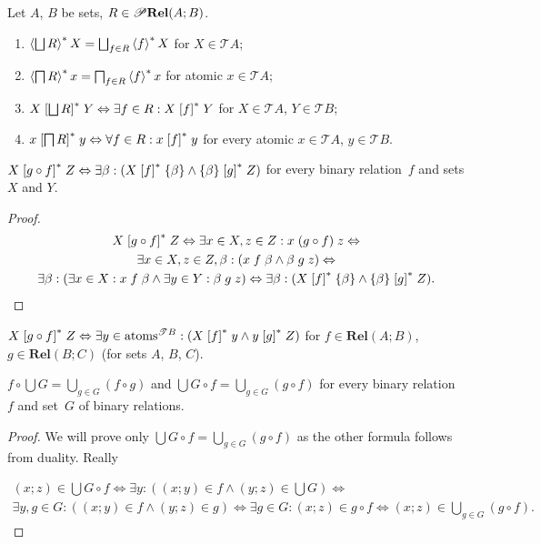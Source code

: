 \begin{cor}
Let $A$, $B$ be sets, $R\in\mathscr{P}\mathbf{Rel}(A;B)$.
\begin{enumerate}
\item \textbf{$\left\langle \bigsqcup R\right\rangle ^{\ast}X=\bigsqcup_{f\in R}\left\langle f\right\rangle ^{\ast}X$} for
$X\in\mathscr{T}A$;
\item $\left\langle \bigsqcap R\right\rangle ^{\ast}x=\bigsqcap_{f\in R}\left\langle f\right\rangle ^{\ast}x$ for atomic
$x\in\mathscr{T}A$;
\item $X\mathrel{\left[\bigsqcup R\right]^{\ast}}Y\Leftrightarrow\exists f\in R:X\mathrel{\left[f\right]^{\ast}}Y$
for $X\in\mathscr{T}A$, $Y\in\mathscr{T}B$;
\item $x\mathrel{\left[\bigsqcap R\right]^{\ast}}y\Leftrightarrow\forall f\in R:x\mathrel{\left[f\right]^{\ast}}y$
for every atomic $x\in\mathscr{T}A$, $y\in\mathscr{T}B$.
\end{enumerate}
\end{cor}
\begin{prop}
$X\mathrel{\left[g\circ f\right]^{\ast}}Z\Leftrightarrow\exists\beta:(X\mathrel{\left[f\right]^{\ast}}\{\beta\}\land\{\beta\}\mathrel{\left[g\right]^{\ast}}Z)$
for every binary relation~$f$ and sets $X$ and $Y$.\end{prop}
\begin{proof}
~
\begin{multline*}
X\mathrel{\left[g\circ f\right]^{\ast}}Z\Leftrightarrow\exists x\in X,z\in Z:x\mathrel{(g\circ f)}z\Leftrightarrow\\
\exists x\in X,z\in Z,\beta:(x\mathrel f\beta\land\beta\mathrel gz)\Leftrightarrow\\
\exists\beta:(\exists x\in X:x\mathrel f\beta\land\exists y\in Y:\beta\mathrel gz)\Leftrightarrow\exists\beta:(X\mathrel{\left[f\right]^{\ast}}\{\beta\}\land\{\beta\}\mathrel{\left[g\right]^{\ast}}Z).
\end{multline*}
\end{proof}
\begin{cor}
$X\mathrel{\left[g\circ f\right]^{\ast}}Z\Leftrightarrow\exists y\in\operatorname{atoms}^{\mathscr{T}B}:(X\mathrel{\left[f\right]^{\ast}}y\land y\mathrel{\left[g\right]^{\ast}}Z)$
for $f\in\mathbf{Rel}(A;B)$, $g\in\mathbf{Rel}(B;C)$ (for sets $A$,
$B$, $C$).\end{cor}
\begin{prop}
$f\circ\bigcup G=\bigcup_{g\in G}(f\circ g)$ and $\bigcup G\circ f=\bigcup_{g\in G}(g\circ f)$
for every binary relation~$f$ and set~$G$ of binary relations.\end{prop}
\begin{proof}
We will prove only $\bigcup G\circ f=\bigcup_{g\in G}(g\circ f)$
as the other formula follows from duality. Really

\begin{multline*}
(x;z)\in\bigcup G\circ f\Leftrightarrow\exists y:((x;y)\in f\land(y;z)\in\bigcup G)\Leftrightarrow\\
\exists y,g\in G:((x;y)\in f\land(y;z)\in g)\Leftrightarrow\exists g\in G:(x;z)\in g\circ f\Leftrightarrow(x;z)\in\bigcup_{g\in G}(g\circ f).
\end{multline*}
\end{proof}
